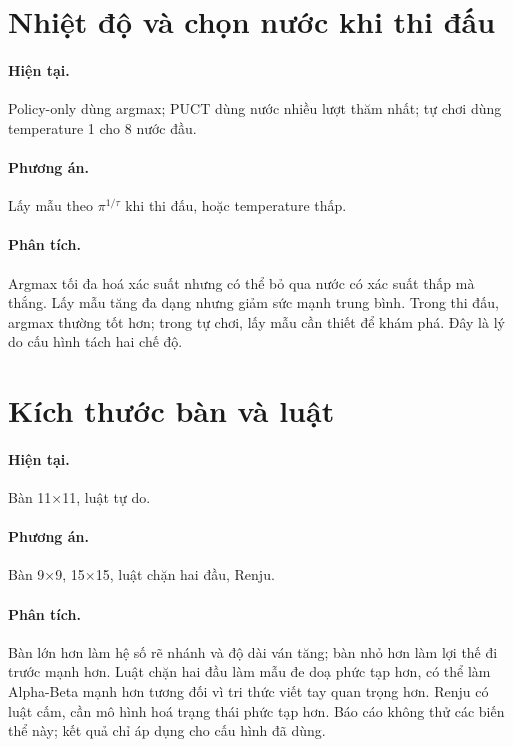 \section{Nhiệt độ và chọn nước khi thi đấu}
\paragraph{Hiện tại.} Policy-only dùng argmax; PUCT dùng nước nhiều lượt thăm nhất; tự chơi
dùng temperature 1 cho 8 nước đầu.
\paragraph{Phương án.} Lấy mẫu theo $\pi^{1/\tau}$ khi thi đấu, hoặc temperature thấp.
\paragraph{Phân tích.} Argmax tối đa hoá xác suất nhưng có thể bỏ qua nước có xác suất thấp mà
thắng. Lấy mẫu tăng đa dạng nhưng giảm sức mạnh trung bình. Trong thi đấu, argmax thường tốt
hơn; trong tự chơi, lấy mẫu cần thiết để khám phá. Đây là lý do cấu hình tách hai chế độ.

\section{Kích thước bàn và luật}
\paragraph{Hiện tại.} Bàn 11×11, luật tự do.
\paragraph{Phương án.} Bàn 9×9, 15×15, luật chặn hai đầu, Renju.
\paragraph{Phân tích.} Bàn lớn hơn làm hệ số rẽ nhánh và độ dài ván tăng; bàn nhỏ hơn làm lợi
thế đi trước mạnh hơn. Luật chặn hai đầu làm mẫu đe doạ phức tạp hơn, có thể làm Alpha-Beta
mạnh hơn tương đối vì tri thức viết tay quan trọng hơn. Renju có luật cấm, cần mô hình hoá
trạng thái phức tạp hơn. Báo cáo không thử các biến thể này; kết quả chỉ áp dụng cho cấu hình
đã dùng.

